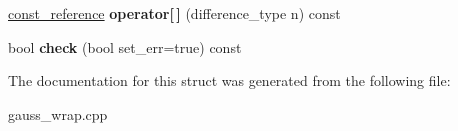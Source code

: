 \begin{DoxyCompactItemize}
\item 
\hypertarget{structswig_1_1_swig_py_sequence___cont_a3e1b9772330900a6e8e8fd4e1d537701}{\hyperlink{structswig_1_1_swig_py_sequence___ref}{const\-\_\-reference} {\bfseries operator\mbox{[}$\,$\mbox{]}} (difference\-\_\-type n) const }\label{structswig_1_1_swig_py_sequence___cont_a3e1b9772330900a6e8e8fd4e1d537701}

\item 
\hypertarget{structswig_1_1_swig_py_sequence___cont_aaa5708e07cf027475b8641c2f2eefea2}{bool {\bfseries check} (bool set\-\_\-err=true) const }\label{structswig_1_1_swig_py_sequence___cont_aaa5708e07cf027475b8641c2f2eefea2}

\end{DoxyCompactItemize}


The documentation for this struct was generated from the following file\-:\begin{DoxyCompactItemize}
\item 
gauss\-\_\-wrap.\-cpp\end{DoxyCompactItemize}
